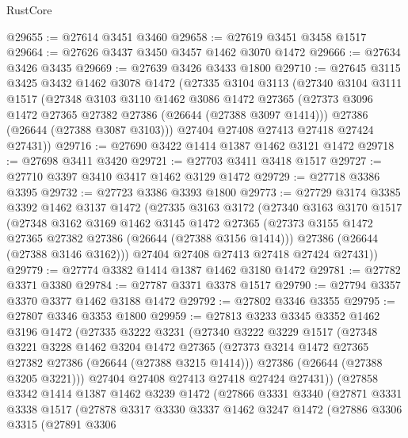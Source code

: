 \begin{lexlean}{RustCore}
\begin{coremodule}
@29655 := @27614 @3451 @3460
@29658 := @27619 @3451 @3458 @1517
@29664 := @27626 @3437 @3450 @3457 @1462 @3070 @1472
@29666 := @27634 @3426 @3435
@29669 := @27639 @3426 @3433 @1800
@29710 := @27645
    @3115
    @3425
    @3432
    @1462
    @3078
    @1472
    (@27335
      @3104
      @3113
      (@27340
        @3104
        @3111
        @1517
        (@27348
          @3103
          @3110
          @1462
          @3086
          @1472
          @27365
          (@27373 @3096 @1472 @27365 @27382 @27386 (@26644 (@27388 @3097 @1414)))
          @27386
          (@26644 (@27388 @3087 @3103)))
        @27404
        @27408
        @27413
        @27418
        @27424
        @27431))
@29716 := @27690 @3422 @1414 @1387 @1462 @3121 @1472
@29718 := @27698 @3411 @3420
@29721 := @27703 @3411 @3418 @1517
@29727 := @27710 @3397 @3410 @3417 @1462 @3129 @1472
@29729 := @27718 @3386 @3395
@29732 := @27723 @3386 @3393 @1800
@29773 := @27729
    @3174
    @3385
    @3392
    @1462
    @3137
    @1472
    (@27335
      @3163
      @3172
      (@27340
        @3163
        @3170
        @1517
        (@27348
          @3162
          @3169
          @1462
          @3145
          @1472
          @27365
          (@27373 @3155 @1472 @27365 @27382 @27386 (@26644 (@27388 @3156 @1414)))
          @27386
          (@26644 (@27388 @3146 @3162)))
        @27404
        @27408
        @27413
        @27418
        @27424
        @27431))
@29779 := @27774 @3382 @1414 @1387 @1462 @3180 @1472
@29781 := @27782 @3371 @3380
@29784 := @27787 @3371 @3378 @1517
@29790 := @27794 @3357 @3370 @3377 @1462 @3188 @1472
@29792 := @27802 @3346 @3355
@29795 := @27807 @3346 @3353 @1800
@29959 := @27813
    @3233
    @3345
    @3352
    @1462
    @3196
    @1472
    (@27335
      @3222
      @3231
      (@27340
        @3222
        @3229
        @1517
        (@27348
          @3221
          @3228
          @1462
          @3204
          @1472
          @27365
          (@27373 @3214 @1472 @27365 @27382 @27386 (@26644 (@27388 @3215 @1414)))
          @27386
          (@26644 (@27388 @3205 @3221)))
        @27404
        @27408
        @27413
        @27418
        @27424
        @27431))
    (@27858
      @3342
      @1414
      @1387
      @1462
      @3239
      @1472
      (@27866
        @3331
        @3340
        (@27871
          @3331
          @3338
          @1517
          (@27878
            @3317
            @3330
            @3337
            @1462
            @3247
            @1472
            (@27886
              @3306
              @3315
              (@27891
                @3306

\end{coremodule}
\end{lexlean}
